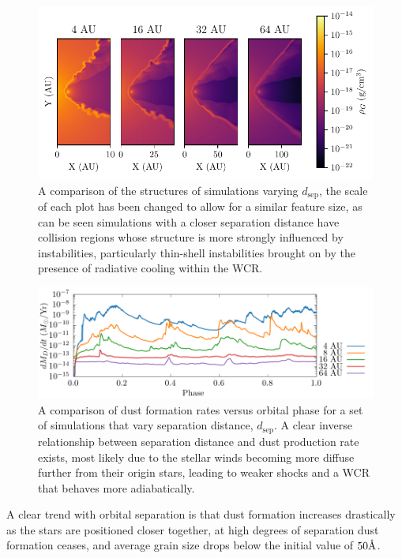 \begin{figure}
  \centering
  \includegraphics{assets/adiabatic-flow/instab-comp-rho.pdf}
  \caption[]{A comparison of the structures of simulations varying $d_\text{sep}$, the scale of each plot has been changed to allow for a similar feature size, as can be seen simulations with a closer separation distance have collision regions whose structure is more strongly influenced by instabilities, particularly thin-shell instabilities brought on by the presence of radiative cooling within the WCR.}
  \label{fig:dsepinstabilities}
\end{figure}


\begin{figure}
  \centering
  \includegraphics{assets/dsep-results/dsep-phase-dust_rate.pdf}
  \caption[Dust formation rate vs. binary separation distance]{A comparison of dust formation rates versus orbital phase for a set of simulations that vary separation distance, $d_\text{sep}$. A clear inverse relationship between separation distance and dust production rate exists, most likely due to the stellar winds becoming more diffuse further from their origin stars, leading to weaker shocks and a WCR that behaves more adiabatically.}
  \label{fig:dsepdustproduction}
\end{figure}

A clear trend with orbital separation is that dust formation increases drastically as the stars are positioned closer together, at high degrees of separation dust formation ceases, and average grain size drops below the initial value of $50 \text \AA$.

